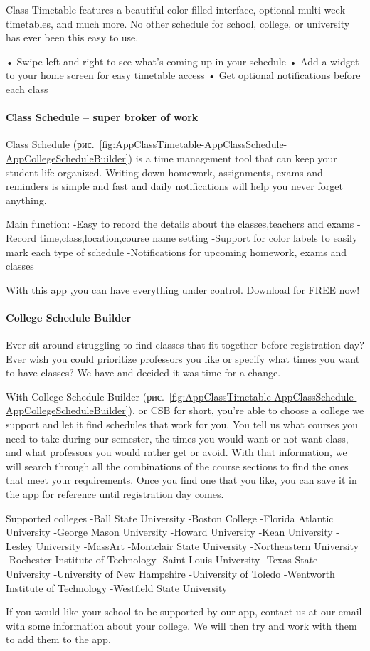 Class Timetable features a beautiful color filled interface, optional multi week timetables, and much more. No other schedule for school, college, or university has ever been this easy to use. 

• Swipe left and right to see what's coming up in your schedule
• Add a widget to your home screen for easy timetable access
• Get optional notifications before each class

\paragraph{Class Schedule – super broker of work}

Class Schedule (рис.~\ref{fig:AppClassTimetable-AppClassSchedule-AppCollegeScheduleBuilder}) is a time management tool that can keep your student life organized. Writing down homework, assignments, exams and reminders is simple and fast and daily notifications will help you never forget anything. 

Main function: 
-Easy to record the details about the classes,teachers and exams
-Record time,class,location,course name setting
-Support for color labels to easily mark each type of schedule
-Notifications for upcoming homework, exams and classes

With this app ,you can have everything under control. Download for FREE now!

\paragraph{College Schedule Builder}

Ever sit around struggling to find classes that fit together before registration day? Ever wish you could prioritize professors you like or specify what times you want to have classes? We have and decided it was time for a change.

With College Schedule Builder (рис.~\ref{fig:AppClassTimetable-AppClassSchedule-AppCollegeScheduleBuilder}), or CSB for short, you're able to choose a college we support and let it find schedules that work for you. You tell us what courses you need to take during our semester, the times you would want or not want class, and what professors you would rather get or avoid. With that information, we will search through all the combinations of the course sections to find the ones that meet your requirements. Once you find one that you like, you can save it in the app for reference until registration day comes.

Supported colleges
-Ball State University
-Boston College
-Florida Atlantic University
-George Mason University
-Howard University
-Kean University
-Lesley University
-MassArt
-Montclair State University
-Northeastern University
-Rochester Institute of Technology
-Saint Louis University
-Texas State University
-University of New Hampshire
-University of Toledo
-Wentworth Institute of Technology
-Westfield State University

If you would like your school to be supported by our app, contact us at our email with some information about your college. We will then try and work with them to add them to the app.
